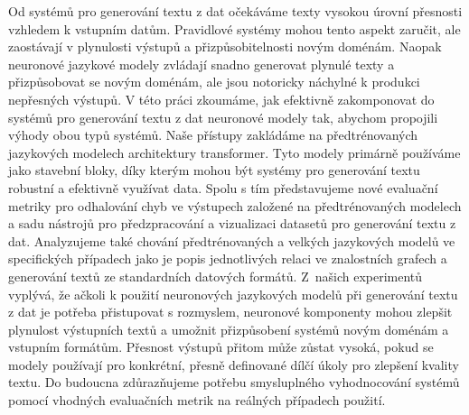 Od systémů pro generování textu z dat očekáváme texty vysokou úrovní přesnosti vzhledem k vstupním datům. Pravidlové systémy mohou tento aspekt zaručit, ale zaostávají v plynulosti výstupů a přizpůsobitelnosti novým doménám. Naopak neuronové jazykové modely zvládají snadno generovat plynulé texty a přizpůsobovat se novým doménám, ale jsou notoricky náchylné k produkci nepřesných výstupů. V této práci zkoumáme, jak efektivně zakomponovat do systémů pro generování textu z dat neuronové modely tak, abychom propojili výhody obou typů systémů. Naše přístupy zakládáme na předtrénovaných jazykových modelech architektury transformer. Tyto modely primárně používáme jako stavební bloky, díky kterým mohou být systémy pro generování textu robustní a efektivně využívat data. Spolu s tím představujeme nové evaluační metriky pro odhalování chyb ve výstupech založené na předtrénovaných modelech a sadu nástrojů pro předzpracování a vizualizaci datasetů pro generování textu z dat. Analyzujeme také chování předtrénovaných a velkých jazykových modelů ve specifických případech jako je popis jednotlivých relaci ve znalostních grafech a generování textů ze standardních datových formátů. Z~našich experimentů vyplývá, že ačkoli k použití neuronových jazykových modelů při generování textu z dat je potřeba přistupovat s rozmyslem, neuronové komponenty mohou zlepšit plynulost výstupních textů a umožnit přizpůsobení systémů novým doménám a vstupním formátům. Přesnost výstupů přitom může zůstat vysoká, pokud se modely používají pro konkrétní, přesně definované dílčí úkoly pro zlepšení kvality textu. Do budoucna zdůrazňujeme potřebu smysluplného vyhodnocování systémů pomocí vhodných evaluačních metrik na reálných případech použití.